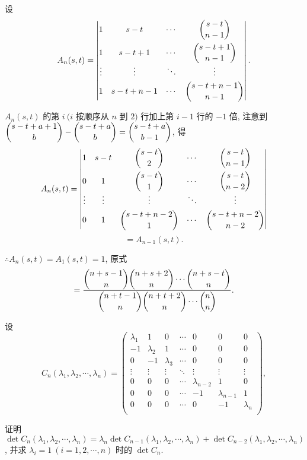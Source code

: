\documentclass[color=black,device=normal,lang=cn,mode=geye]{elegantnote}
\begin{document}
\begin{solution}
    设
    \[A_n(s,t)=\begin{vmatrix}
        1 & s-t & \cdots & \dbinom{s-t}{n-1} \\[10pt]
        1 & s-t+1 & \cdots & \dbinom{s-t+1}{n-1} \\
        \vdots & \vdots & \ddots & \vdots \\[4pt]
        1 & s-t+n-1 & \cdots & \dbinom{s-t+n-1}{n-1} \\
    \end{vmatrix}.\]
    
    $A_n(s,t)$ 的第 $i\ (i$ 按顺序从 $n$ 到 $2)$ 行加上第 $i-1$ 行的 $-1$ 倍, 注意到 $\dbinom{s-t+a+1}{b}-\dbinom{s-t+a}{b}=\dbinom{s-t+a}{b-1}$, 得
    \[A_n(s,t)=\begin{vmatrix}
        1 & s-t & \dbinom{s-t}{2} & \cdots & \dbinom{s-t}{n-1} \\[10pt]
        0 & 1 & \dbinom{s-t}{1} & \cdots & \dbinom{s-t}{n-2} \\
        \vdots & \vdots & \vdots & \ddots & \vdots \\[4pt]
        0 & 1 & \dbinom{s-t+n-2}{1} & \cdots & \dbinom{s-t+n-2}{n-2} \\
    \end{vmatrix}\]
    \[=A_{n-1}(s,t).\]
    
    $\therefore A_n(s,t)=A_1(s,t)=1$, 原式
    \[=\dfrac{\dbinom{n+s-1}{n}\dbinom{n+s+2}{n}\cdots\dbinom{n+s-t}{n}}{\dbinom{n+t-1}{n}\dbinom{n+t+2}{n}\cdots\dbinom{n}{n}}.\]
\end{solution}
\begin{exercise}%
    设
    \[C_n(\lambda_1,\lambda_2,\cdots,\lambda_n)=\begin{pmatrix}
        \lambda_1 & 1 & 0 & \cdots & 0 & 0 & 0 \\
        -1 & \lambda_2 & 1 & \cdots & 0 & 0 & 0 \\
        0 & -1 & \lambda_3 & \cdots & 0 & 0 & 0 \\
        \vdots & \vdots & \vdots & \ddots & \vdots & \vdots & \vdots \\
        0 & 0 & 0 & \cdots & \lambda_{n-2} & 1 & 0 \\
        0 & 0 & 0 & \cdots & -1 & \lambda_{n-1} & 1 \\
        0 & 0 & 0 & \cdots & 0 & -1 & \lambda_n \\
    \end{pmatrix},\]

    证明 $\det C_n(\lambda_1,\lambda_2,\cdots,\lambda_n)=\lambda_n\det C_{n-1}(\lambda_1,\lambda_2,\cdots,\lambda_n)+\det C_{n-2}(\lambda_1,\lambda_2,\cdots,\lambda_n)$, 并求 $\lambda_i=1\ (i=1,2,\cdots,n)$ 时的 $\det C_n$.
\end{exercise}
\end{document}
